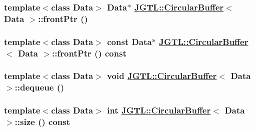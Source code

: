 \hypertarget{class_j_g_t_l_1_1_circular_buffer_9dd2e9b9f34e1aa2f09d2b9a8e756cad}{
\subsubsection[frontPtr]{\setlength{\rightskip}{0pt plus 5cm}template$<$class Data$>$ Data$\ast$ \hyperlink{class_j_g_t_l_1_1_circular_buffer}{JGTL::Circular\-Buffer}$<$ Data $>$::front\-Ptr ()}}
\label{class_j_g_t_l_1_1_circular_buffer_9dd2e9b9f34e1aa2f09d2b9a8e756cad}


\hypertarget{class_j_g_t_l_1_1_circular_buffer_672e8efab885d22536a3c8b4c80abf07}{
\subsubsection[frontPtr]{\setlength{\rightskip}{0pt plus 5cm}template$<$class Data$>$ const Data$\ast$ \hyperlink{class_j_g_t_l_1_1_circular_buffer}{JGTL::Circular\-Buffer}$<$ Data $>$::front\-Ptr () const}}
\label{class_j_g_t_l_1_1_circular_buffer_672e8efab885d22536a3c8b4c80abf07}


\hypertarget{class_j_g_t_l_1_1_circular_buffer_cd22f74b9be2e34fa6ac23358f0626d6}{
\subsubsection[dequeue]{\setlength{\rightskip}{0pt plus 5cm}template$<$class Data$>$ void \hyperlink{class_j_g_t_l_1_1_circular_buffer}{JGTL::Circular\-Buffer}$<$ Data $>$::dequeue ()}}
\label{class_j_g_t_l_1_1_circular_buffer_cd22f74b9be2e34fa6ac23358f0626d6}


\hypertarget{class_j_g_t_l_1_1_circular_buffer_f107566d80cdecd1bd22af12cf9fe7e8}{
\subsubsection[size]{\setlength{\rightskip}{0pt plus 5cm}template$<$class Data$>$ int \hyperlink{class_j_g_t_l_1_1_circular_buffer}{JGTL::Circular\-Buffer}$<$ Data $>$::size () const}}
\label{class_j_g_t_l_1_1_circular_buffer_f107566d80cdecd1bd22af12cf9fe7e8}


